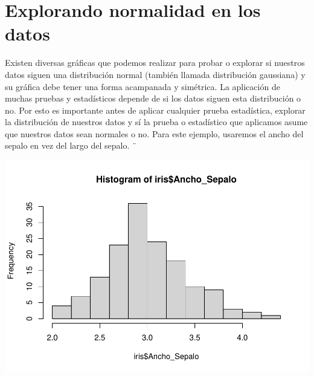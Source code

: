 \documentclass[
]{book}
\newenvironment{Shaded}{\begin{snugshade}}{\end{snugshade}}
\newcommand{\FunctionTok}[1]{\textcolor[rgb]{0.13,0.29,0.53}{\textbf{#1}}}
\newcommand{\NormalTok}[1]{#1}
\newcommand{\SpecialCharTok}[1]{\textcolor[rgb]{0.81,0.36,0.00}{\textbf{#1}}}
\begin{document}
\hfill\break

\section{Explorando normalidad en los datos}\label{explorando-normalidad-en-los-datos}

Existen diversas gráficas que podemos realizar para probar o explorar si nuestros datos siguen una distribución normal (también llamada distribución gaussiana) y su gráfica debe tener una forma acampanada y simétrica.
La aplicación de muchas pruebas y estadísticos depende de si los datos siguen esta distribución o no.
Por esto es importante antes de aplicar cualquier prueba estadística, explorar la distribución de nuestros datos y sí la prueba o estadístico que aplicamos asume que nuestros datos sean normales o no.
Para este ejemplo, usaremos el ancho del sepalo en vez del largo del sepalo.
¨

\hfill\break

\begin{Shaded}
\end{Shaded}

\includegraphics{R_Manual_files/figure-latex/unnamed-chunk-247-1.pdf}

\begin{Shaded}
\end{Shaded}
\end{document}
